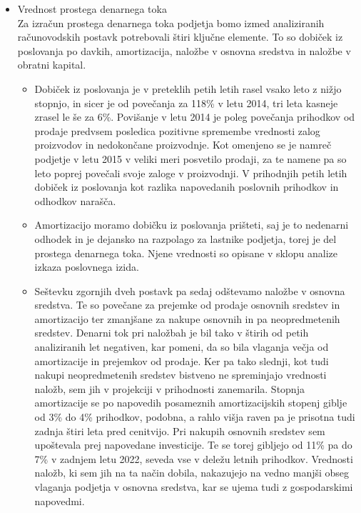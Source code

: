 \documentclass[12pt,a4paper]{amsart}
\theoremstyle{definition} %
\theoremstyle{plain} %
\begin{document}
\begin{itemize}
\item Vrednost prostega denarnega toka\\
Za izračun prostega denarnega toka podjetja bomo izmed analiziranih računovodskih postavk potrebovali štiri ključne elemente. To so dobiček iz poslovanja po davkih, amortizacija, naložbe v osnovna sredstva in naložbe v obratni kapital. 
\begin{itemize}
\item Dobiček iz poslovanja je v preteklih petih letih rasel vsako leto z nižjo stopnjo, in sicer je od povečanja za 118\% v letu 2014, tri leta kasneje zrasel le še za 6\%. Povišanje v letu 2014 je poleg povečanja prihodkov od prodaje predvsem posledica pozitivne spremembe vrednosti zalog proizvodov in nedokončane proizvodnje. Kot omenjeno se je namreč podjetje v letu 2015 v veliki meri posvetilo prodaji, za te namene pa so leto poprej povečali svoje zaloge v proizvodnji. V prihodnjih petih letih dobiček iz poslovanja kot razlika napovedanih poslovnih prihodkov in odhodkov narašča. 
\item Amortizacijo moramo dobičku iz poslovanja prišteti, saj je to nedenarni odhodek in je dejansko na razpolago za lastnike podjetja, torej je del prostega denarnega toka. Njene vrednosti so opisane v sklopu analize izkaza poslovnega izida.
\item Seštevku zgornjih dveh postavk pa sedaj odštevamo naložbe v osnovna sredstva. Te so povečane za prejemke od prodaje osnovnih sredstev in amortizacijo ter zmanjšane za nakupe osnovnih in pa neopredmetenih sredstev. Denarni tok pri naložbah je bil tako v štirih od petih analiziranih let negativen, kar pomeni, da so bila vlaganja večja od amortizacije in prejemkov od prodaje. Ker pa tako slednji, kot tudi nakupi neopredmetenih sredstev bistveno ne spreminjajo vrednosti naložb, sem jih v projekciji v prihodnosti zanemarila. Stopnja amortizacije se po napovedih posameznih amortizacijskih stopenj giblje od 3\% do 4\% prihodkov, podobna, a rahlo višja raven pa je prisotna tudi zadnja štiri leta pred cenitvijo. Pri nakupih osnovnih sredstev sem upoštevala prej napovedane investicije. Te se torej gibljejo od 11\% pa do 7\% v zadnjem letu 2022, seveda vse v deležu letnih prihodkov. Vrednosti naložb, ki sem jih na ta način dobila, nakazujejo na vedno manjši obseg vlaganja podjetja v osnovna sredstva, kar se ujema tudi z gospodarskimi napovedmi.

\end{itemize}
\end{itemize}
\end{document}
